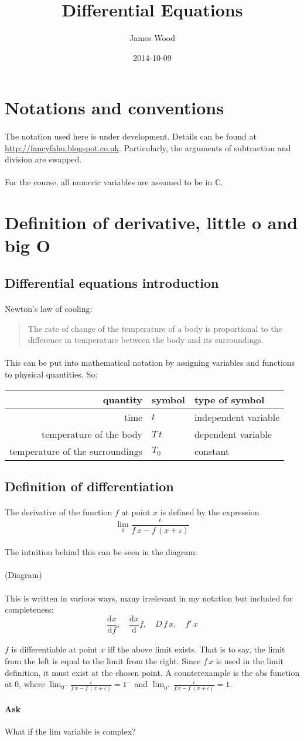 \documentclass[11pt]{article}
\title{\textbf{Differential Equations}}
\author{James Wood}
\date{2014-10-09}
\newcommand*\C{\ensuremath{\mathbb C}}
\newcommand*\id{\iota}
\newcommand*\prg{\paragraph}
\begin{document}
\maketitle

\section*{Notations and conventions}
\prg{}The notation used here is under development. Details can be found at \url{http://fancyfahu.blogspot.co.uk}. Particularly, the arguments of subtraction and division are swapped.

\prg{}For the course, all numeric variables are assumed to be in \C.

\section{Definition of derivative, little o and big O}

\subsection{Differential equations introduction}
\prg{}Newton's law of cooling:
\begin{quotation}The rate of change of the temperature of a body is proportional to the difference in temperature between the body and its surroundings.\end{quotation}

\prg{}This can be put into mathematical notation by assigning variables and functions to physical quantities. So:\\
\begin{tabular}{r l l}
quantity & symbol & type of symbol \\
\hline
time & $t$ & independent variable \\
temperature of the body & $T\,t$ & dependent variable \\
temperature of the surroundings & $T_0$ & constant \\
\end{tabular}
\subsection{Definition of differentiation}
\prg{}The derivative of the function $f$ at point $x$ is defined by the expression \[
\lim_0{\frac{\id}{f\,x-f\,(x+\id)}}
\]
\prg{}The intuition behind this can be seen in the diagram:
\prg{}(Diagram)
\prg{}This is written in various ways, many irrelevant in my notation but included for completeness:
\[
\frac{\mathrm dx}{\mathrm df}, \quad \frac{\mathrm dx}{\mathrm d}f, \quad D\,f\,x, \quad f'\,x
\]
\prg{}$f$ is differentiable at point $x$ iff the above limit exists. That is to say, the limit from the left is equal to the limit from the right. Since $f\,x$ is used in the limit definition, it must exist at the chosen point. A counterexample is the abs function at 0, where $\lim_{0^-}\frac{\id}{f\,x-f\,(x+\id)}=1^-$ and $\lim_{0^+}\frac{\id}{f\,x-f\,(x+\id)}=1$.
\prg{Ask}What if the lim variable is complex?
\end{document}

